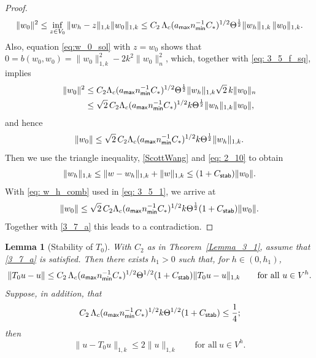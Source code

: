 \documentclass[numbers,webpdf,imaiai]{ima-authoring-template}%
\theoremstyle{thmstyletwo}%
\newtheorem{lemma}[theorem]{Lemma}
\numberwithin{equation}{section}
\newcommand{\Cstar}{C_{\ast}}
\numberwithin{equation}{section}
\newcommand{\Cstab}{C_{\textup{\textsf{stab}}}}
\newcommand{\amax}{a_{\textup{\textsf{max}}}}
\newcommand{\nmin}{n_{\textup{\textsf{min}}}}
\begin{document}
{\begin{proof}
\begin{equation}
	\|w_0\|^2 \le \inf_{z \in V_0}\|w_h-z\|_{1,k} \|w_0\|_{1,k}
	\le C_2\, \Lambda_c (\amax \nmin^{-1} \Cstar)^{1/2}
	\Theta^{\frac{1}{2}}\|w_h\|_{1,k} \, \|w_0\|_{1,k}.
\end{equation}
Also, equation \eqref{eq:w_0_sol} with $z=w_0$ shows that
$0 = b(w_0,w_0) = \|w_0\|_{1,k}^2-2k^2\|w_0\|_n^2$, which, together with \eqref{eq: 3_5_f_sq}, implies
\begin{align*}
	\|w_0\|^2 &\le C_2 \Lambda_c (\amax \nmin^{-1} \Cstar)^{1/2} \Theta^{\frac{1}{2}} \|w_h\|_{1,k}\sqrt{2}\, k \|w_0\|_n
	\\
	&\le \sqrt{2}\, C_2 \Lambda_c (\amax \nmin^{-1} \Cstar)^{1/2} k \Theta^{\frac{1}{2}} \|w_h\|_{1,k} \|w_0\|,
\end{align*}
and hence
\begin{equation}\label{eq: 3_5_1} 
	\|w_0\| \le \sqrt{2}\, C_2 \Lambda_c (\amax \nmin^{-1} \Cstar)^{1/2} k \Theta^{\frac{1}{2}} \|w_h\|_{1,k}. 
\end{equation}
Then we use the triangle inequality, \eqref{ScottWang} and \eqref{eq: 2_10} to obtain
\begin{equation}
	\|w_h\|_{1,k} \le \|w-w_h\|_{1,k} + \|w\|_{1,k}  \le (1 + \Cstab )\|w_0\|.
	\label{eq: w_h_comb}
\end{equation}
With \eqref{eq: w_h_comb} used in \eqref{eq: 3_5_1}, we arrive at
\begin{equation*}
	\|w_0\| \le  \sqrt{2}\, C_2 \Lambda_c (\amax \nmin^{-1} \Cstar)^{1/2} k \Theta^{\frac{1}{2}} (1+\Cstab)\|w_0\|.
\end{equation*}
Together with \eqref{3_7_a} this leads to a contradiction.
\end{proof}


\begin{lemma}[Stability of $T_0$]
\label{lemma: 3_7}
With $C_2$ as in Theorem~\ref{Lemma_3_1}, assume that \eqref{3_7_a} is satisfied.  Then there exists $h_1>0$ such that, for $h\in(0,h_1)$, 
\begin{equation}
	\|T_0 u - u\| \le {C_2}\, \Lambda_c (\amax \nmin^{-1} \Cstar)^{1/2}
	\Theta^{1/2} (1 + \Cstab)\|T_0 u - u\|_{1,k} \qquad \text{for all} \ u \in V^h.
	\label{3_7_b}
\end{equation}
Suppose, in addition, that 
\begin{equation}\label{3_7_c}
	C_2\, \Lambda_c (\amax \nmin^{-1} \Cstar)^{1/2} k \Theta^{1/2} (1 + \Cstab)
	\le \frac{1}{4};
\end{equation} 
then 
\begin{equation}\label{3_7_d}
	\|u - T_0 u\|_{1,k} \le 2 \|u\|_{1,k} \qquad \text{for all} \ u \in V^h.
\end{equation}
\end{lemma}

}
\end{document}
